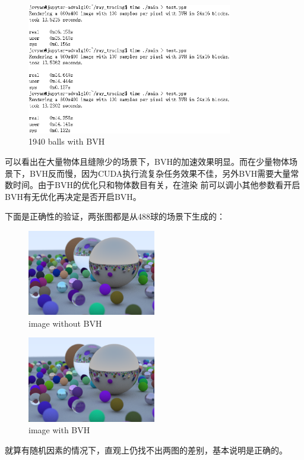 \documentclass[UTF8, a4paper, 11pt]{article}
\begin{document}
\begin{figure}[H]
    \centering
    \includegraphics[width=0.8\textwidth]{1940_bvh.png}
    \caption{1940 balls with BVH}
\end{figure}
可以看出在大量物体且缝隙少的场景下，BVH的加速效果明显。而在少量物体场景下，BVH反而慢，因为CUDA执行流复杂任务效果不佳，另外BVH需要大量常数时间。由于BVH的优化只和物体数目有关，在渲染
前可以调小其他参数看开启BVH有无优化再决定是否开启BVH。

下面是正确性的验证，两张图都是从488球的场景下生成的：
\begin{figure}[H]
    \centering
    \includegraphics[width=0.5\textwidth, bb=0 0 20cm 20cm]{test_no_bvh.bmp}
    \caption{image without BVH}
\end{figure}
\begin{figure}[H]
    \centering
    \includegraphics[width=0.5\textwidth, bb=0 0 20cm 20cm]{test_bvh.bmp}
    \caption{image with BVH}
\end{figure}
就算有随机因素的情况下，直观上仍找不出两图的差别，基本说明是正确的。
%
%
\end{document}
